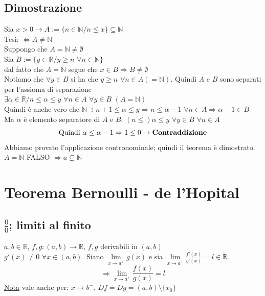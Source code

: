 \documentclass{article}
\newcommand{\R}{\mathbb{R}}
\newcommand{\N}{\mathbb{N}}
\newcommand{\Rext}{\widetilde{\mathbb{R}}}
\newcommand{\vSpace}{\vspace{1em}}
\begin{document}
\begin{flushleft}
\subsection{Dimostrazione}
Sia $x>0 \rightarrow A:=\{n \in \N / n \leq x\}\subseteq \N$\\
Tesi: $\iff A \neq \N$\\

\vSpace
Suppongo che $A = \N \neq \emptyset$\\
Sia $B := \{y \in \R / y \geq n$ $ \forall n \in \N\}$\\
dal fatto che $A = \N$ segue che $x \in B \Rightarrow B \neq \emptyset$\\
Notiamo che $\forall y \in B$ si ha che $y \geq n$ $\forall n \in A (= \N)$. Quindi $A$ e $B$ sono separati per l'assioma di separazione\\
$\exists \alpha \in \R / n \leq \alpha \leq y$ $\forall n \in A$ $\forall y \in B$ \vspace*{1em} $(A = \N)$\\
Quindi è anche vero che $\N \ni n+1 \leq \alpha \leq y \Rightarrow n \leq \alpha - 1$ $\forall n \in A \Rightarrow \alpha - 1 \in B$\\
Ma $\alpha$ è elemento separatore  di $A$ e $B$: $(n \leq ) \alpha \leq y $ $\forall y \in B$ $\forall n \in A$\\
\[\text{Quindi }\alpha \leq \alpha - 1 \Rightarrow 1 \leq 0 \rightarrow \text{\textbf{Contraddizione}}\]
Abbiamo provato l'applicazione contronominale; quindi il teorema è dimostrato.\\
$A = \N$ FALSO $\Rightarrow a \subsetneq \N$

\section{Teorema Bernoulli - de l'Hopital}
\subsection{$\frac{0}{0}$; limiti al finito}
$a, b \in \R$, $f, g:(a,b) \rightarrow \R$, $f,g $ derivabili in $(a,b)$\\
\underline{$g'(x) \neq 0$} $\forall x \in (a,b)$. Siano $\lim\limits_{x \to a^+}g(x)$ e sia $\lim\limits_{x \to a^+}\frac{f'(x)}{g'(x)} = l \in \Rext$.\\
\[ \Rightarrow \lim\limits_{x \to a^+}\frac{f(x)}{g(x)} = l\]
\underline{Nota} vale anche per: $x \rightarrow b^-$, $Df = Dg = (a,b) \setminus \{x_0\}$


\end{flushleft}
\end{document}

